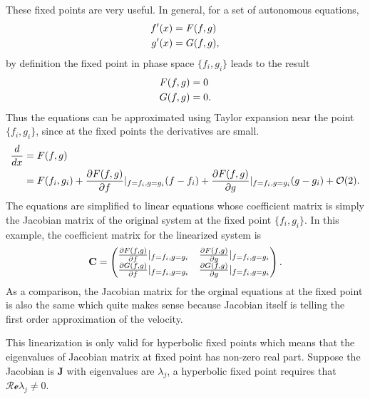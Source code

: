\documentclass[letterpaper,12pt,english]{sphinxmanual}
\begin{document}
These fixed points are very useful. In general, for a set of autonomous equations,
\begin{gather}
\begin{split}f'(x) & = F(f,g)\\
g'(x) & = G(f,g),\end{split}\notag
\end{gather}
by definition the fixed point in phase space \(\{f_i,g_i\}\) leads to the result
\begin{gather}
\begin{split}F(f,g) & = 0\\
G(f,g) & = 0.\end{split}\notag
\end{gather}
Thus the equations can be approximated using Taylor expansion near the point \(\{f_i,g_i\}\), since at the fixed points the derivatives are small.
\begin{gather}
\begin{split}\frac{d}{dx} &= F(f,g) \\
& = F(f_i,g_i) + \frac{\partial F(f,g)}{\partial f}\vert_{f=f_i,g=g_i} (f-f_i)+ \frac{\partial F(f,g)}{\partial g}\vert_{f=f_i,g=g_i} (g-g_i)+ \mathcal O(2).\end{split}\notag
\end{gather}
The equations are simplified to linear equations whose coefficient matrix is simply the Jacobian matrix of the original system at the fixed point \(\{f_i,g_i \}\). In this example, the coefficient matrix for the linearized system is
\begin{gather}
\begin{split}\mathbf{C} = \begin{pmatrix} \frac{\partial F(f,g)}{\partial f}\vert_{f=f_i,g=g_i} &   \frac{\partial F(f,g)}{\partial g}\vert_{f=f_i,g=g_i}  \\
\frac{\partial G(f,g)}{\partial f}\vert_{f=f_i,g=g_i}  &  \frac{\partial G(f,g)}{\partial g}\vert_{f=f_i,g=g_i}  \end{pmatrix}.\end{split}\notag
\end{gather}
As a comparison, the Jacobian matrix for the orginal equations at the fixed point is also the same which quite makes sense because Jacobian itself is telling the first order approximation of the velocity.

This linearization is only valid for hyperbolic fixed points which means that the eigenvalues of Jacobian matrix at fixed point has non-zero real part. Suppose the Jacobian is \(\mathbf{J}\) with eigenvalues are \(\lambda_j\), a hyperbolic fixed point requires that \(\mathcal{Re}\lambda_j\neq 0\).
\end{document}
